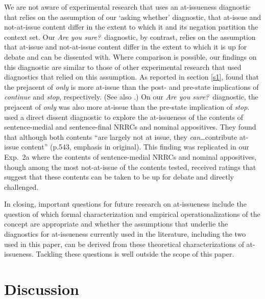 \documentclass[11pt,fleqn]{article}
\newcommand{\6}{\mbox{$[\hspace*{-.6mm}[$}}
\newcommand{\9}{\mbox{$]\hspace*{-.6mm}]$}}
\begin{document}
We are not aware of experimental research that uses an at-issueness diagnostic that relies on the assumption of our `asking whether' diagnostic, that at-issue and not-at-issue content differ in the extent to which it and its negation partition the context set. Our {\em Are you sure?}~diagnostic, by contrast, relies on the assumption that at-issue and not-at-issue content differ in the extent to which it is up for debate and can be dissented with. Where comparison is possible, our findings on this diagnostic are similar to those of other experimental research that used diagnostics that relied on this assumption. As reported in section \ref{s1}, \citet{amaral-etal11} found that the prejacent of {\em only} is more at-issue than the post- and pre-state implications of {\em continue} and {\em stop}, respectively. (See also \citealt{cummins-etal2012}.) On our {\em Are you sure?}~diagnostic, the prejacent of {\em only} was also more at-issue than the pre-state implication of {\em stop}. \citet{syrett-koev2015} used a direct dissent diagnostic to explore the at-issueness of the contents of sentence-medial and sentence-final NRRCs and nominal appositives. They found that although both contents ``are largely not at issue, they {\em can}\ldots contribute at-issue content'' (p.543, emphasis in original). This finding was replicated in our Exp.~2a where the contents of sentence-medial NRRCs and nominal appositives, though among the most not-at-issue of the contents tested, received ratings that suggest that these contents can be taken to be up for debate and directly challenged.

In closing, important questions for future research on at-issueness include the question of which formal characterization and empirical operationalizations of the concept are appropriate and whether the assumptions that underlie the diagnostics for at-issueness currently used in the literature, including the two used in this paper, can be derived from these theoretical characterizations of at-issueness. Tackling these questions is well outside the scope of this paper.
 

\section{Discussion}\label{s5}
\end{document}
